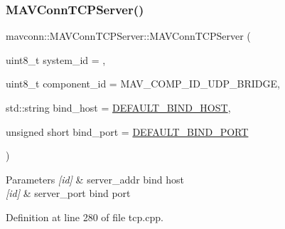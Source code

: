 \subsubsection{\texorpdfstring{MAVConnTCPServer()}{MAVConnTCPServer()}}
{\footnotesize\ttfamily mavconn\+::\+M\+A\+V\+Conn\+T\+C\+P\+Server\+::\+M\+A\+V\+Conn\+T\+C\+P\+Server (\begin{DoxyParamCaption}\item[{uint8\+\_\+t}]{system\+\_\+id = {},  }\item[{uint8\+\_\+t}]{component\+\_\+id = {\ttfamily MAV\+\_\+COMP\+\_\+ID\+\_\+UDP\+\_\+BRIDGE},  }\item[{std\+::string}]{bind\+\_\+host = {\ttfamily \mbox{\hyperlink{group__mavconn_gae043843ee4b947094ca58342c442c3b6}{D\+E\+F\+A\+U\+L\+T\+\_\+\+B\+I\+N\+D\+\_\+\+H\+O\+ST}}},  }\item[{unsigned short}]{bind\+\_\+port = {\ttfamily \mbox{\hyperlink{group__mavconn_gacf9d47d0f198105f4a27c9668ba793b1}{D\+E\+F\+A\+U\+L\+T\+\_\+\+B\+I\+N\+D\+\_\+\+P\+O\+RT}}} }\end{DoxyParamCaption})}


\begin{DoxyParams}{Parameters}
{\em \mbox{[}id\mbox{]}} & server\+\_\+addr bind host \\
\hline
{\em \mbox{[}id\mbox{]}} & server\+\_\+port bind port \\
\hline
\end{DoxyParams}


Definition at line 280 of file tcp.\+cpp.

\mbox{\label{group__mavconn_ga22deee111faac2fde80a0affc6c29245}} 
